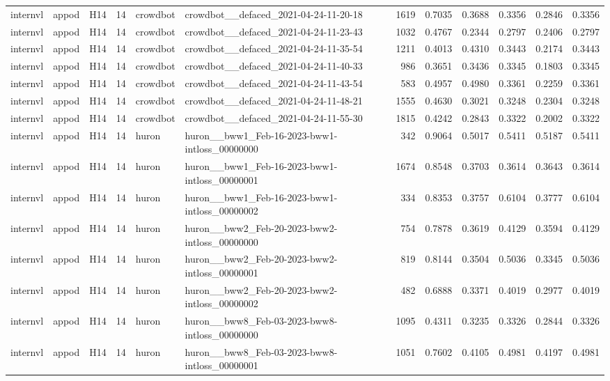 \begin{table}[tbp]
\begin{tabular}{lllrllrrrrrr}
internvl & appod & H14 & 14 & crowdbot & crowdbot\_\_defaced\_2021-04-24-11-20-18 & 1619 & 0.7035 & 0.3688 & 0.3356 & 0.2846 & 0.3356 \\
internvl & appod & H14 & 14 & crowdbot & crowdbot\_\_defaced\_2021-04-24-11-23-43 & 1032 & 0.4767 & 0.2344 & 0.2797 & 0.2406 & 0.2797 \\
internvl & appod & H14 & 14 & crowdbot & crowdbot\_\_defaced\_2021-04-24-11-35-54 & 1211 & 0.4013 & 0.4310 & 0.3443 & 0.2174 & 0.3443 \\
internvl & appod & H14 & 14 & crowdbot & crowdbot\_\_defaced\_2021-04-24-11-40-33 & 986 & 0.3651 & 0.3436 & 0.3345 & 0.1803 & 0.3345 \\
internvl & appod & H14 & 14 & crowdbot & crowdbot\_\_defaced\_2021-04-24-11-43-54 & 583 & 0.4957 & 0.4980 & 0.3361 & 0.2259 & 0.3361 \\
internvl & appod & H14 & 14 & crowdbot & crowdbot\_\_defaced\_2021-04-24-11-48-21 & 1555 & 0.4630 & 0.3021 & 0.3248 & 0.2304 & 0.3248 \\
internvl & appod & H14 & 14 & crowdbot & crowdbot\_\_defaced\_2021-04-24-11-55-30 & 1815 & 0.4242 & 0.2843 & 0.3322 & 0.2002 & 0.3322 \\
internvl & appod & H14 & 14 & huron & huron\_\_bww1\_Feb-16-2023-bww1-intloss\_00000000 & 342 & 0.9064 & 0.5017 & 0.5411 & 0.5187 & 0.5411 \\
internvl & appod & H14 & 14 & huron & huron\_\_bww1\_Feb-16-2023-bww1-intloss\_00000001 & 1674 & 0.8548 & 0.3703 & 0.3614 & 0.3643 & 0.3614 \\
internvl & appod & H14 & 14 & huron & huron\_\_bww1\_Feb-16-2023-bww1-intloss\_00000002 & 334 & 0.8353 & 0.3757 & 0.6104 & 0.3777 & 0.6104 \\
internvl & appod & H14 & 14 & huron & huron\_\_bww2\_Feb-20-2023-bww2-intloss\_00000000 & 754 & 0.7878 & 0.3619 & 0.4129 & 0.3594 & 0.4129 \\
internvl & appod & H14 & 14 & huron & huron\_\_bww2\_Feb-20-2023-bww2-intloss\_00000001 & 819 & 0.8144 & 0.3504 & 0.5036 & 0.3345 & 0.5036 \\
internvl & appod & H14 & 14 & huron & huron\_\_bww2\_Feb-20-2023-bww2-intloss\_00000002 & 482 & 0.6888 & 0.3371 & 0.4019 & 0.2977 & 0.4019 \\
internvl & appod & H14 & 14 & huron & huron\_\_bww8\_Feb-03-2023-bww8-intloss\_00000000 & 1095 & 0.4311 & 0.3235 & 0.3326 & 0.2844 & 0.3326 \\
internvl & appod & H14 & 14 & huron & huron\_\_bww8\_Feb-03-2023-bww8-intloss\_00000001 & 1051 & 0.7602 & 0.4105 & 0.4981 & 0.4197 & 0.4981 \\

\end{tabular}
\end{table}
